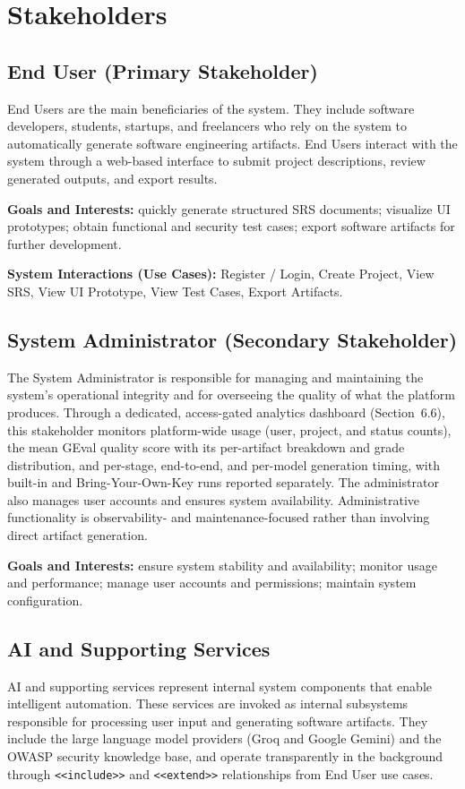\documentclass[12pt,a4paper,oneside]{report}
\begin{document}
\section{Stakeholders}
\subsection{End User (Primary Stakeholder)}
End Users are the main beneficiaries of the system. They include software developers, students, startups, and freelancers who rely on the system to automatically generate software engineering artifacts. End Users interact with the system through a web-based interface to submit project descriptions, review generated outputs, and export results.

\noindent\textbf{Goals and Interests:} quickly generate structured SRS documents; visualize UI prototypes; obtain functional and security test cases; export software artifacts for further development.

\noindent\textbf{System Interactions (Use Cases):} Register / Login, Create Project, View SRS, View UI Prototype, View Test Cases, Export Artifacts.

\subsection{System Administrator (Secondary Stakeholder)}
The System Administrator is responsible for managing and maintaining the system's operational integrity and for overseeing the quality of what the platform produces. Through a dedicated, access-gated analytics dashboard (Section~6.6), this stakeholder monitors platform-wide usage (user, project, and status counts), the mean GEval quality score with its per-artifact breakdown and grade distribution, and per-stage, end-to-end, and per-model generation timing, with built-in and Bring-Your-Own-Key runs reported separately. The administrator also manages user accounts and ensures system availability. Administrative functionality is observability- and maintenance-focused rather than involving direct artifact generation.

\noindent\textbf{Goals and Interests:} ensure system stability and availability; monitor usage and performance; manage user accounts and permissions; maintain system configuration.

\subsection{AI and Supporting Services}
AI and supporting services represent internal system components that enable intelligent automation. These services are invoked as internal subsystems responsible for processing user input and generating software artifacts. They include the large language model providers (Groq and Google Gemini) and the OWASP security knowledge base, and operate transparently in the background through \texttt{<<include>>} and \texttt{<<extend>>} relationships from End User use cases.
\end{document}
